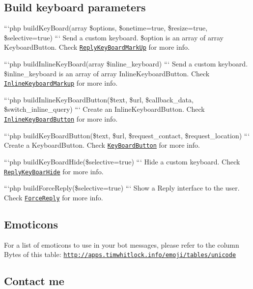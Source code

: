 \subsection*{Build keyboard parameters }

```php build\-Key\-Board(array \$options, \$onetime=true, \$resize=true, \$selective=true) ``` Send a custom keyboard. \$option is an array of array Keyboard\-Button. Check \href{https://core.telegram.org/bots/api#replykeyboardmarkup}{\tt Reply\-Key\-Board\-Mark\-Up} for more info.

```php build\-Inline\-Key\-Board(array \$inline\-\_\-keyboard) ``` Send a custom keyboard. \$inline\-\_\-keyboard is an array of array Inline\-Keyboard\-Button. Check \href{https://core.telegram.org/bots/api#inlinekeyboardmarkup}{\tt Inline\-Keyboard\-Markup} for more info.

```php build\-Inline\-Key\-Board\-Button(\$text, \$url, \$callback\-\_\-data, \$switch\-\_\-inline\-\_\-query) ``` Create an Inline\-Keyboard\-Button. Check \href{https://core.telegram.org/bots/api#inlinekeyboardbutton}{\tt Inline\-Key\-Board\-Button} for more info.

```php build\-Key\-Board\-Button(\$text, \$url, \$request\-\_\-contact, \$request\-\_\-location) ``` Create a Keyboard\-Button. Check \href{https://core.telegram.org/bots/api#keyboardbutton}{\tt Key\-Board\-Button} for more info.

```php build\-Key\-Board\-Hide(\$selective=true) ``` Hide a custom keyboard. Check \href{https://core.telegram.org/bots/api#replykeyboardhide}{\tt Reply\-Key\-Boar\-Hide} for more info.

```php build\-Force\-Reply(\$selective=true) ``` Show a Reply interface to the user. Check \href{https://core.telegram.org/bots/api#forcereply}{\tt Force\-Reply} for more info.

\subsection*{Emoticons }

For a list of emoticons to use in your bot messages, please refer to the column Bytes of this table\-: \href{http://apps.timwhitlock.info/emoji/tables/unicode}{\tt http\-://apps.\-timwhitlock.\-info/emoji/tables/unicode}

\subsection*{Contact me }

